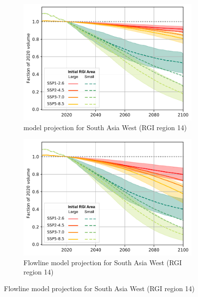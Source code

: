 \begin{figure}[htp]
          \vspace*{0.5cm}

          \begin{subfigure}[b]{0.476\textwidth}
              \caption{\Vas{} model projection for South Asia West (RGI region 14) }
              \label{fig:cmip:area_classes_reg_14}
              \centering
              \includegraphics[width=\textwidth]{../plots/final_plots/time_series/cmip/area_classes_vas_14.pdf}
          \end{subfigure}
          \hfill
          \begin{subfigure}[b]{0.476\textwidth}
              \caption{Flowline model projection for South Asia West (RGI region 14) }
              \label{fig:cmip:area_classes_14}
              \centering
              \includegraphics[width=\textwidth]{../plots/final_plots/time_series/cmip/area_classes_fl_14.pdf}
          \end{subfigure}


\end{figure}
